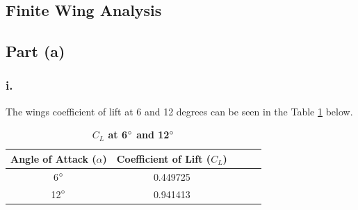 \begin{singlespace}
\section{Finite Wing Analysis}
\subsection{Part (a)}
\subsubsection{i.}
The wings coefficient of lift at 6 and 12 degrees can be seen in the Table \ref{table:2ai} below.

    \begin{table}[H]
    \centering
    \caption{\textbf{$C_L$ at 6$\degree$ and 12$\degree$}} \label{table:2ai}
        \begin{tabular}{|c|c|c|c|c|} %
            \hline \textbf{Angle of Attack ($\alpha$)} & \textbf{Coefficient of Lift ($C_L$)} \\ \hline %
            6$\degree$ & 0.449725 \\ \hline
           12$\degree$ & 0.941413 \\ \hline
        \end{tabular}
        \label{table:2ai}
    \end{table}

    

\end{singlespace}
